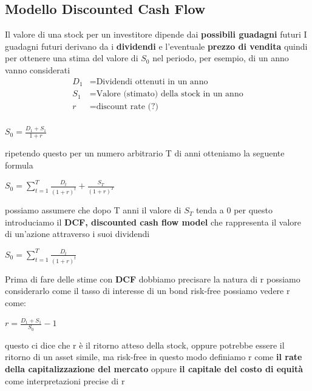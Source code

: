 \documentclass[a4paper,11pt]{report}
\begin{document}
{\subsection{Modello Discounted Cash Flow}
	Il valore di una stock per un investitore dipende dai \textbf{possibili guadagni} futuri \newline
	I guadagni futuri derivano da i \textbf{dividendi} e l'eventuale \textbf{prezzo di vendita} \newline
	quindi per ottenere una stima del valore di $S_0$ nel periodo, per esempio, di un anno vanno considerati
\begin{align*}
	\text{$D_1$} &= \text{Dividendi ottenuti in un anno}\\
	\text{$S_1$} &= \text{Valore (stimato) della stock in un anno}\\
	r &= \text{discount rate (?)}\\
\end{align*}
\begin{center}
	$S_0={\frac{D_1+S_1}{1+r}}$
\end{center}
	 ripetendo questo per un numero arbitrario T di anni otteniamo la seguente formula
\begin{center}
	$S_0 =\sum\limits_{t=1}^T {\frac {D_t}{(1+r)^t}}+{\frac {S_T}{(1+r)^T}}$
\end{center}	
	possiamo assumere che dopo T anni il valore di $S_T$ tenda a 0  \newline
	per questo introduciamo il \textbf{DCF, discounted cash flow model} che rappresenta il valore di un'azione attraverso i suoi 		dividendi
\begin{center}
	$S_0 =\sum\limits_{t=1}^T {\frac {D_t}{(1+r)^t}}$
\end{center}
	Prima di fare delle stime con \textbf{DCF} dobbiamo precisare la natura di r \newline
	possiamo considerarlo come il tasso di interesse di un bond risk-free \newline
	possiamo vedere r come:
\begin{center}
	$r={\frac {D_1 + S_1}{S_0}}-1$
\end{center}
	questo ci dice che r è il ritorno %
	atteso della stock, oppure potrebbe essere il ritorno di un asset simile, ma risk-free \newline
	in questo modo definiamo r come \textbf{il rate della capitalizzazione del mercato} oppure \textbf{il capitale del costo di 			equità} come interpretazioni precise di r

}
\end{document}
